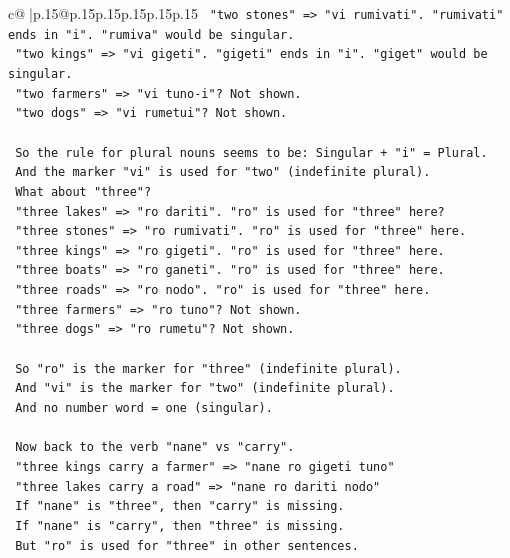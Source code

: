 \documentclass{article}
\begin{document}
{\begin{supertabular}{c@{$\;$}|p{.15\linewidth}@{}p{.15\linewidth}p{.15\linewidth}p{.15\linewidth}p{.15\linewidth}p{.15\linewidth}}
{{{\texttt{   "two stones" => "vi rumivati". "rumivati" ends in "i". "rumiva" would be singular.} \\
\texttt{   "two kings" => "vi gigeti". "gigeti" ends in "i". "giget" would be singular.} \\
\texttt{   "two farmers" => "vi tuno{-}i"? Not shown.} \\
\texttt{   "two dogs" => "vi rumetui"? Not shown.} \\
\\ 
\texttt{   So the rule for plural nouns seems to be: Singular + "i" = Plural.} \\
\texttt{   And the marker "vi" is used for "two" (indefinite plural).} \\
\texttt{   What about "three"?} \\
\texttt{   "three lakes" => "ro dariti". "ro" is used for "three" here?} \\
\texttt{   "three stones" => "ro rumivati". "ro" is used for "three" here.} \\
\texttt{   "three kings" => "ro gigeti". "ro" is used for "three" here.} \\
\texttt{   "three boats" => "ro ganeti". "ro" is used for "three" here.} \\
\texttt{   "three roads" => "ro nodo". "ro" is used for "three" here.} \\
\texttt{   "three farmers" => "ro tuno"? Not shown.} \\
\texttt{   "three dogs" => "ro rumetu"? Not shown.} \\
\\ 
\texttt{   So "ro" is the marker for "three" (indefinite plural).} \\
\texttt{   And "vi" is the marker for "two" (indefinite plural).} \\
\texttt{   And no number word = one (singular).} \\
\\ 
\texttt{   Now back to the verb "nane" vs "carry".} \\
\texttt{   "three kings carry a farmer" => "nane ro gigeti tuno"} \\
\texttt{   "three lakes carry a road" => "nane ro dariti nodo"} \\
\texttt{   If "nane" is "three", then "carry" is missing.} \\
\texttt{   If "nane" is "carry", then "three" is missing.} \\
\texttt{   But "ro" is used for "three" in other sentences.} \\
}}}
\end{supertabular}}
\end{document}

